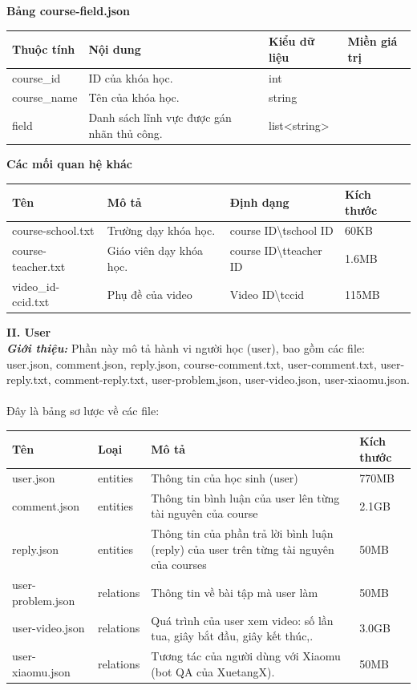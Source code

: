 \textbf{Bảng course-field.json}
\begin{center}
\begin{tabular}{|| m{5em}  m{10em}  m{6em}  m{11em}||} 
 \hline
 Thuộc tính & Nội dung & Kiểu dữ liệu & Miền giá trị \\ [0.5ex] 
 \hline\hline
 course\_id & ID của khóa học. & int & \\
 \hline
 course\_name & Tên của khóa học. & string &  \\ \hline
 field & Danh sách lĩnh vực được gán nhãn thủ công. & list<string> &  \\ [1ex] 
 \hline
\end{tabular}
\end{center}
\textbf{Các mối quan hệ khác}
\begin{center}
\begin{tabular}{|| m{5em}  m{10em}  m{11em}  m{5em}||} 
 \hline
 Tên & Mô tả & Định dạng & Kích thước \\ [0.5ex] 
 \hline\hline
course-school.txt & Trường dạy khóa học. & {course ID}\textbackslash t{school ID} &60KB \\
 \hline
 course-teacher.txt &Giáo viên dạy khóa học. & {course ID}\textbackslash t{teacher ID} & 1.6MB \\ \hline
 video\_id-ccid.txt & Phụ đề của video & {Video ID}\textbackslash t{ccid} &115MB  \\ [1ex] 
 \hline
\end{tabular}
\end{center}
\textbf{II. User}\\
\textbf{\textit{Giới thiệu:}} Phần này mô tả hành vi người học (user), bao gồm các file: user.json, comment.json, reply.json, course-comment.txt, user-comment.txt, user-reply.txt, comment-reply.txt, user-problem,json, user-video.json, user-xiaomu.json.\\
\\
Đây là bảng sơ lược về các file:
%
\begin{center}
\begin{tabular}{|| m{10em}  m{5em}  m{11em}  m{5em}||} 
 \hline
 Tên & Loại & Mô tả & Kích thước \\ [0.5ex] 
 \hline\hline
user.json &entities & Thông tin của học sinh (user) &770MB \\
 \hline
 comment.json &entities & Thông tin bình luận của user lên từng tài nguyên của course & 2.1GB \\ \hline
 reply.json & entities &Thông tin của phần trả lời bình luận (reply) của user trên từng tài nguyên của courses &50MB\\
 \hline
 user-problem.json &relations & Thông tin về bài tập mà user làm & 50MB \\ \hline
 user-video.json &relations & Quá trình của user xem video: số lần tua, giây bắt đầu, giây kết thúc,.& 3.0GB \\ \hline
 user-xiaomu.json & relations &  Tương tác của người dùng với Xiaomu (bot QA của XuetangX).  &50MB  \\ [1ex] 
 \hline
\end{tabular}
\end{center}
